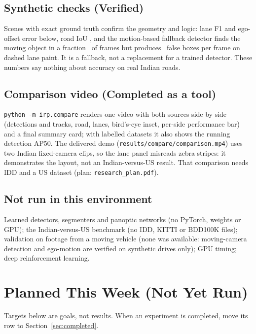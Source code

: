 \documentclass[11pt,a4paper]{article}
\begin{document}
\subsection*{Synthetic checks (Verified)}
Scenes with exact ground truth confirm the geometry and logic: lane F1 and ego-offset error below, road IoU \vSynRoadIou, and the motion-based fallback detector finds the moving object in a fraction \vSynMotionHit\ of frames but produces \vSynMotionFp\ false boxes per frame on dashed lane paint.
It is a fallback, not a replacement for a trained detector. These numbers say nothing about accuracy on real Indian roads.
\begin{table}[H]
\centering\small
\caption{Lane detection on synthetic scenes.}

\end{table}

\subsection*{Comparison video (Completed as a tool)}
\texttt{python -m irp.compare} renders one video with both sources side by side (detections and tracks, road, lanes, bird's-eye inset, per-side performance bar) and a final summary card; with labelled datasets it also shows the running detection AP50.
The delivered demo (\texttt{results/compare/comparison.mp4}) uses two Indian fixed-camera clips, so the lane panel misreads zebra stripes: it demonstrates the layout, not an Indian-versus-US result. That comparison needs IDD and a US dataset (plan: \texttt{research\_plan.pdf}).

\subsection*{Not run in this environment}
Learned detectors, segmenters and panoptic networks (no PyTorch, weights or GPU); the Indian-versus-US benchmark (no IDD, KITTI or BDD100K files); validation on footage from a moving vehicle (none was available: moving-camera detection and ego-motion are verified on synthetic drives only); GPU timing; deep reinforcement learning.

\section{Planned This Week (Not Yet Run)}\label{sec:planned}
Targets below are goals, not results. When an experiment is completed, move its row to Section~\ref{sec:completed}.
\end{document}
